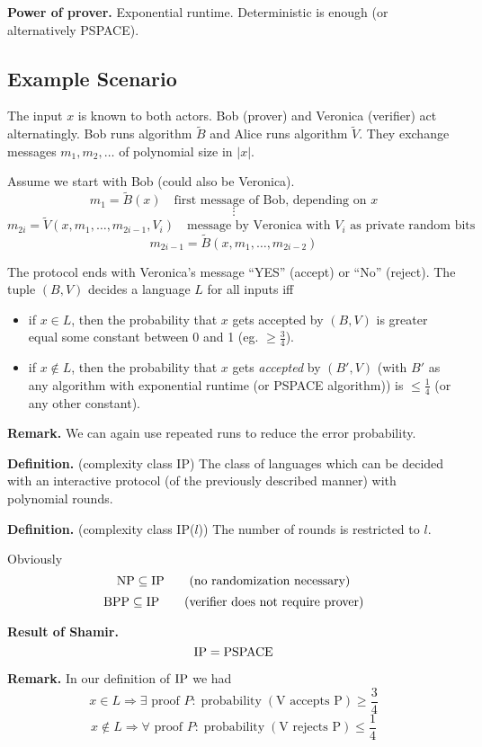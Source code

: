 \documentclass[a4paper]{article}
\newcommand{\cls}[1]{\rm{#1}}
\DeclareMathOperator{\prop}{probability}
\begin{document}
\textbf{Power of prover.}
  Exponential runtime. Deterministic is enough (or alternatively
  PSPACE).

\subsection{Example Scenario}
%
The input $x$ is known to both actors. Bob (prover) and Veronica
(verifier) act alternatingly. Bob runs algorithm $\tilde{B}$ and
Alice runs algorithm $\tilde{V}$. They exchange messages $m_1,
m_2, \ldots$ of polynomial size in $|x|$.

Assume we start with Bob (could also be Veronica).
\[
  m_1 = \tilde{B}(x)   \quad\text{first message of Bob, depending on }x
\] \[
  \vdots
\] \[
  m_{2i} = \tilde{V}(x, m_1, \ldots, m_{2i-1}, V_i)
      \quad\text{message by Veronica with $V_i$ as private random bits}
\] \[
  m_{2i-1} = \tilde{B}(x, m_1, \ldots, m_{2i-2})
\]

The protocol ends with Veronica's message ``YES'' (accept) or
``No'' (reject). The tuple $(B, V)$ decides a language $L$
for all inputs iff
\begin{itemize}
  \item if $x \in L$, then the probability that $x$ gets accepted
        by $(B, V)$ is greater equal some constant between 0 and 1
        (eg. $\geq \frac34$).
  \item if $x \notin L$, then the probability that $x$ gets \emph{accepted}
        by $(B', V)$ (with $B'$ as any algorithm with exponential runtime
        (or PSPACE algorithm)) is $\leq \frac14$ (or any other constant).
\end{itemize}

\textbf{Remark.}
  We can again use repeated runs to reduce the error probability.

\textbf{Definition.} (complexity class \cls{IP})
  The class of languages which can be decided with an interactive protocol
  (of the previously described manner) with polynomial rounds.

\textbf{Definition.} (complexity class \cls{IP($l$)})
  The number of rounds is restricted to $l$.

Obviously
\[
  \cls{NP} \subseteq \cls{IP}  \qquad \text{(no randomization necessary)}
\] \[
  \cls{BPP} \subseteq \cls{IP}  \qquad \text{(verifier does not require prover)}
\]

\textbf{Result of Shamir.}
\[
  \cls{IP} = \cls{PSPACE}
\]

\textbf{Remark.}
In our definition of $\cls{IP}$ we had
\[
  x \in L \Rightarrow \exists \text{ proof } P:
    \prop(\text{V accepts P}) \geq \frac34
\] \[
  x \notin L \Rightarrow \forall \text{ proof } P:
    \prop(\text{V rejects P}) \leq \frac14
\]
\end{document}
